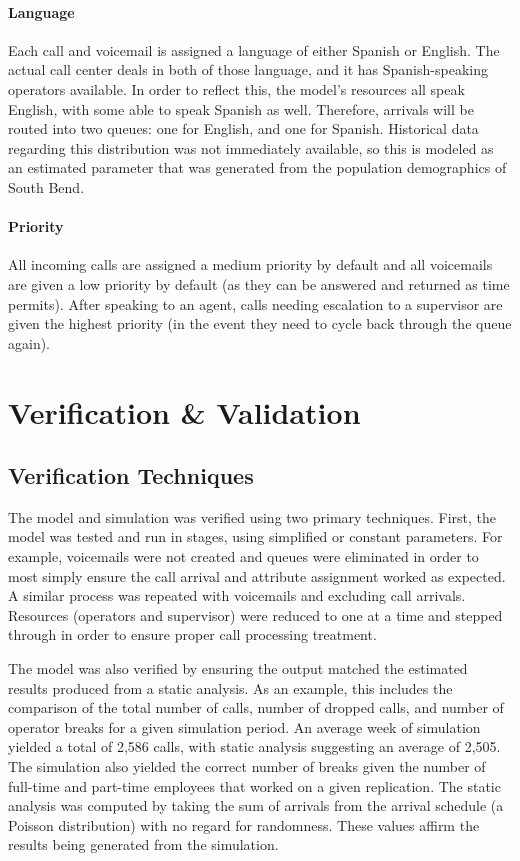 \documentclass[12pt,twocolumn]{article}
\begin{document}
	\paragraph{Language}

Each call and voicemail is assigned a language of either Spanish or English.  The actual call center deals in both of those language, and it has Spanish-speaking operators available.  In order to reflect this, the model's resources all speak English, with some able to speak Spanish as well.  Therefore, arrivals will be routed into two queues:  one for English, and one for Spanish.  Historical data regarding this distribution was not immediately available, so this is modeled as an estimated parameter that was generated from the population demographics of South Bend.

	\paragraph{Priority}

All incoming calls are assigned a medium priority by default and all voicemails are given a low priority by default (as they can be answered and returned as time permits).  After speaking to an agent, calls needing escalation to a supervisor are given the highest priority (in the event they need to cycle back through the queue again).


\section{Verification \& Validation}

	\subsection{Verification Techniques}

The model and simulation was verified using two primary techniques.  First, the model was tested and run in stages, using simplified or constant parameters.  For example, voicemails were not created and queues were eliminated in order to most simply ensure the call arrival and attribute assignment worked as expected.  A similar process was repeated with voicemails and excluding call arrivals.  Resources (operators and supervisor) were reduced to one at a time and stepped through in order to ensure proper call processing treatment.  

\par

The model was also verified by ensuring the output matched the estimated results produced from a static analysis.  As an example, this includes the comparison of the total number of calls, number of dropped calls, and number of operator breaks for a given simulation period.  An average week of simulation yielded a total of 2,586 calls, with static analysis suggesting an average of 2,505.  The simulation also yielded the correct number of breaks given the number of full-time and part-time employees that worked on a given replication.  The static analysis was computed by taking the sum of arrivals from the arrival schedule (a Poisson distribution) with no regard for randomness.  These values affirm the results being generated from the simulation.
	
\end{document}
